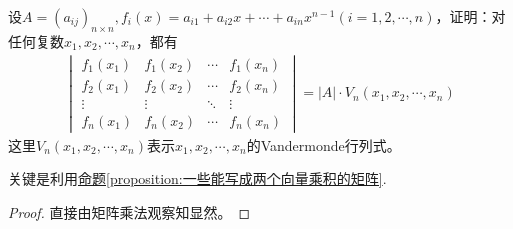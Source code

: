 \documentclass[../../main.tex]{subfiles}
\begin{document}
\begin{proposition}\label{proposition:将矩阵拆分成Vandermode矩阵的形式}
设\(A = (a_{ij})_{n\times n},f_i(x)=a_{i1}+a_{i2}x+\cdots+a_{in}x^{n - 1}(i = 1,2,\cdots,n)\)，证明：对任何复数\(x_1,x_2,\cdots,x_n\)，都有
\begin{align*}
\begin{vmatrix}
f_1(x_1)&f_1(x_2)&\cdots&f_1(x_n)\\
f_2(x_1)&f_2(x_2)&\cdots&f_2(x_n)\\
\vdots&\vdots&\ddots&\vdots\\
f_n(x_1)&f_n(x_2)&\cdots&f_n(x_n)
\end{vmatrix}=|A|\cdot V_n(x_1,x_2,\cdots,x_n)
\end{align*}
这里\(V_n(x_1,x_2,\cdots,x_n)\)表示\(x_1,x_2,\cdots,x_n\)的Vandermonde行列式。
\end{proposition}
\begin{note}
关键是利用\hyperref[proposition:一些能写成两个向量乘积的矩阵]{命题\ref{proposition:一些能写成两个向量乘积的矩阵}}.
\end{note}
\begin{proof}
直接由矩阵乘法观察知显然。 
\end{proof}
\end{document}
